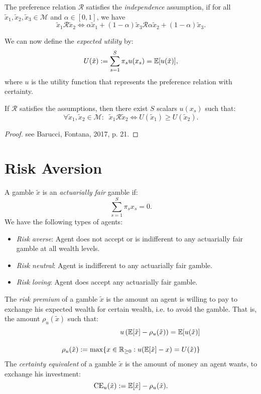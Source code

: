 \documentclass[twoside, titlepage]{article}
\begin{document}
\begin{assumption}[Independence]
    The preference relation $\mathcal{R}$ satisfies the \textit{independence} assumption, if for all $\tilde{x}_1, \tilde{x}_2, \tilde{x}_3 \in \mathcal{M}$ and $\alpha \in [0,1]$, we have
    \[
        \tilde{x}_1 \mathcal{R} \tilde{x}_2 \iff \alpha \tilde{x}_1 + (1 - \alpha)\tilde{x}_3 \mathcal{R} \alpha \tilde{x}_2 + (1 - \alpha)\tilde{x}_3.
    \]
\end{assumption}
We can now define the \textit{expected utility} by:
\[
    U(\tilde{x}) := \sum^S_{s=1}\pi_s u(x_s) = \mathbb{E}[u(\tilde{x})],
\]
where $u$ is the utility function that represents the preference relation with certainty.

\begin{theorem}[Theorem 2.1] %
    If $\mathcal{R}$ satisfies the assumptions, then there exist $S$ scalars $u(x_s)$ such that:
    \[
        \forall \tilde{x}_1, \tilde{x}_2 \in \mathcal{M} : \;\; \tilde{x}_1 \mathcal{R} \tilde{x}_2 \iff U(\tilde{x}_1) \geq U(\tilde{x}_2).
    \]
\end{theorem}

\begin{proof}
    see Barucci, Fontana, 2017, p. 21.
\end{proof}

\section{Risk Aversion}
A gamble $\tilde{x}$ is an \textit{actuarially fair} gamble if:
\[
    \sum^S_{s=1}\pi_s x_s = 0.
\]
We have the following types of agents:
\begin{itemize}
    \item \textit{Risk averse}: Agent does not accept or is indifferent to any actuarially fair gamble at all wealth levels.
    \item \textit{Risk neutral}: Agent is indifferent to any actuarially fair gamble.
    \item \textit{Risk loving}: Agent does accept any actuarially fair gamble.
\end{itemize}
The \textit{risk premium} of a gamble $\tilde{x}$ is the amount an agent is willing to pay to exchange his expected wealth for certain wealth, i.e. to avoid the gamble. That is, the amount $\rho_u(\tilde{x})$ such that:
\begin{align*}
    u\left(\mathbb{E}[\tilde{x}] - \rho_u(\tilde{x})\right) = \mathbb{E}[u(\tilde{x})] \\[10pt]
    \rho_u(\tilde{x}) := \max \{x \in \mathbb{R}_{\geq0} : u(\mathbb{E}[\tilde{x}] - x) = U(\tilde{x})\}
\end{align*}
The \textit{certainty equivalent} of a gamble $\tilde{x}$ is the amount of money an agent wants, to exchange his investment:
\[
    \text{CE}_u(\tilde{x}) := \mathbb{E}[\tilde{x}] - \rho_u(\tilde{x}).
\]
\end{document}

